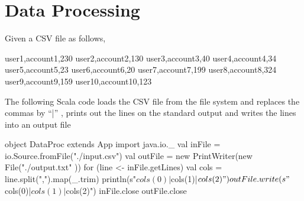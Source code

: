 \documentclass[10pt]{article}
\newcommand{\comment}[1]{}
\begin{document}
\comment{
\subsection{Sample Answer}

\begin{code}
sealed trait Exp
case class Val(v:Int) extends Exp
case class Plus(e1:Exp, e2:Exp) extends Exp
case class Minus(e1:Exp, e2:Exp) extends Exp
case class Mult(e1:Exp, e2:Exp) extends Exp
case class Div(e1:Exp, e2:Exp) extends Exp

def simp(e:Exp):Exp = e match
{
        case Val(v)            => e
        case Plus(Val(0), e2)  => e2
        case Plus(e1, Val(0))  => e1
        case Plus(e1,e2)       => Plus(simp(e1), simp(e2))
        case Minus(e1, Val(0)) => e1
        case Minus(e1, e2)     => Minus(simp(e1), simp(e2))
        case Mult(Val(1), e2)  => e2
        case Mult(e1, Val(1))  => e1
        case Mult(e1, e2)      => Mult(simp(e1), simp(e2))
        case Div(e1, Val(1))   => e1
        case Div(e1, e2)       => Div(simp(e1), simp(e2))
}

def simpFix(e:Exp):Exp =
{
        val e2 = simp(e)
        if (e == e2)
        {
                e
        }
        else
        {
                simpFix(e2)
        }
}
\end{code}
}




\section{Data Processing}

Given a CSV file as follows,
\begin{code}
user1,account1,230
user2,account2,130
user3,account3,40
user4,account4,34
user5,account5,23
user6,account6,20
user7,account7,199
user8,account8,324
user9,account9,159
user10,account10,123
\end{code}

The following Scala code loads the CSV file from the file system and
replaces the commas by ``|'' , prints out the lines on the standard
output and writes the lines into an output file

\begin{code}
object DataProc extends App {
  import java.io._
  val inFile = io.Source.fromFile("./input.csv")
  val outFile = new PrintWriter(new File("./output.txt" ))
  for (line <- inFile.getLines) {
    val cols = line.split(",").map(_.trim)
    println(s"${cols(0)}|${cols(1)}|${cols(2)}")
    outFile.write(s"${cols(0)}|${cols(1)}|${cols(2)}\n")
  }
  inFile.close
  outFile.close
}
\end{code}
\end{document}
